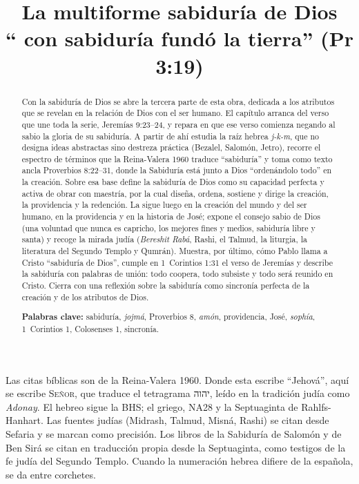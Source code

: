 \documentclass[11pt,letterpaper]{article}
\title{\color{azul}\bfseries La multiforme sabiduría de Dios\\[4pt]\large\color{gris}\mdseries ``\SENOR{} con sabiduría fundó la tierra'' (Pr 3:19)}
\author{}\date{}
\newcommand{\heb}[1]{\mbox{\foreignlanguage{hebrew}{#1}}}
\newcommand{\SENOR}{\textsc{Señor}}
\begin{document}
\maketitle\thispagestyle{empty}

\begin{abstract}\noindent
Con la sabiduría de Dios se abre la tercera parte de esta obra, dedicada a los atributos que se revelan en la relación de Dios con el ser humano. El capítulo arranca del verso que une toda la serie, Jeremías 9:23--24, y repara en que ese verso comienza negando al sabio la gloria de su sabiduría. A partir de ahí estudia la raíz hebrea \emph{j-k-m}, que no designa ideas abstractas sino destreza práctica (Bezalel, Salomón, Jetro), recorre el espectro de términos que la Reina-Valera 1960 traduce ``sabiduría'' y toma como texto ancla Proverbios 8:22--31, donde la Sabiduría está junto a Dios ``ordenándolo todo'' en la creación. Sobre esa base define la sabiduría de Dios como su capacidad perfecta y activa de obrar con maestría, por la cual diseña, ordena, sostiene y dirige la creación, la providencia y la redención. La sigue luego en la creación del mundo y del ser humano, en la providencia y en la historia de José; expone el consejo sabio de Dios (una voluntad que nunca es capricho, los mejores fines y medios, sabiduría libre y santa) y recoge la mirada judía (\emph{Bereshit Rabá}, Rashi, el Talmud, la liturgia, la literatura del Segundo Templo y Qumrán). Muestra, por último, cómo Pablo llama a Cristo ``sabiduría de Dios'', cumple en 1~Corintios 1:31 el verso de Jeremías y describe la sabiduría con palabras de unión: todo coopera, todo subsiste y todo será reunido en Cristo. Cierra con una reflexión sobre la sabiduría como sincronía perfecta de la creación y de los atributos de Dios.
\par\smallskip\noindent\textbf{Palabras clave:} sabiduría, \emph{jojmá}, Proverbios 8, \emph{amón}, providencia, José, \emph{sophía}, 1~Corintios 1, Colosenses 1, sincronía.\end{abstract}

\begin{nota}
Las citas bíblicas son de la Reina-Valera 1960. Donde esta escribe ``Jehová'', aquí se escribe \SENOR, que traduce el tetragrama \heb{יהוה}, leído en la tradición judía como \emph{Adonay}. El hebreo sigue la BHS; el griego, NA28 y la Septuaginta de Rahlfs-Hanhart. Las fuentes judías (Midrash, Talmud, Misná, Rashi) se citan desde Sefaria y se marcan como precisión. Los libros de la Sabiduría de Salomón y de Ben Sirá se citan en traducción propia desde la Septuaginta, como testigos de la fe judía del Segundo Templo. Cuando la numeración hebrea difiere de la española, se da entre corchetes.
\end{nota}
\end{document}
